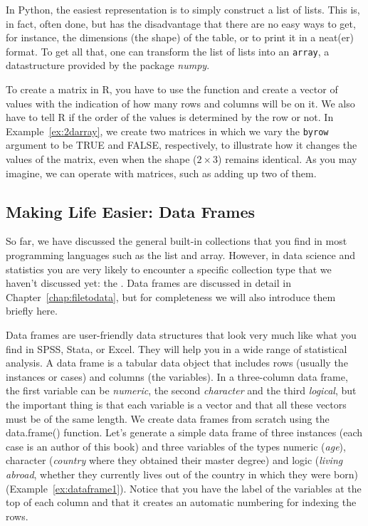 
In Python, the easiest representation is to simply construct a list of
lists. This is, in fact, often done, but has the disadvantage that
there are no easy ways to get, for instance, the dimensions (the
shape) of the table, or to print it in a neat(er) format. To get all
that, one can transform the list of lists into an \verb|array|, a
datastructure provided by the package \emph{numpy}.

To create a matrix in R, you have to use the function  and
create a vector of values with the indication of how many rows and
columns will be on it. We also have to tell R if the order of the
values is determined by the row or not. In Example~\ref{ex:2darray}, we create
two matrices in which we vary the \verb|byrow| argument to be TRUE and
FALSE, respectively, to illustrate how it changes the values of the
matrix, even when the shape ($2 \times3$) remains identical. As you may
imagine, we can operate with matrices, such as adding up two of them.


\subsection{Making Life Easier: Data Frames}\label{sec:dataframes}

So far, we have discussed the general built-in collections that you find in most programming languages
such as the list and array.
However, in data science and statistics you are very likely to encounter a specific collection type that we haven't discussed yet: the .
Data frames are discussed in detail in Chapter~\ref{chap:filetodata},
but for completeness we will also introduce them briefly here. 

Data frames are user-friendly data structures that look very much like
what you find in SPSS, Stata, or Excel. They will help you in a wide
range of statistical analysis.  A
data frame is a tabular data object that includes rows (usually the
instances or cases) and columns (the variables). In a three-column data frame,
the first variable can be \emph{numeric}, the second \emph{character}
and the third \emph{logical}, but the important thing is that each
variable is a vector and that all these vectors must be of the same
length. We create data frames from scratch using the data.frame()
function.  Let’s generate a simple data frame of three instances (each
case is an author of this book) and three variables of the types
numeric (\emph{age}), character (\emph{country} where they obtained their
master degree) and logic (\emph{living abroad}, whether they currently
lives out of the country in which they were born) (Example~\ref{ex:dataframe1}).
Notice that you have the label of the variables at the top of each column and that it creates an automatic numbering for indexing the rows.  

